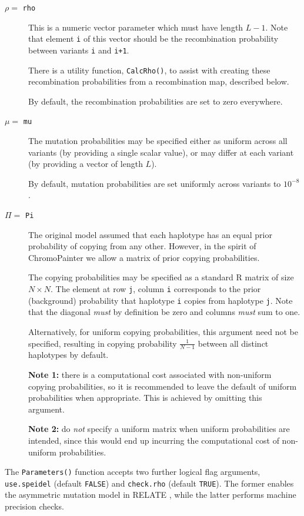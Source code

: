 \documentclass[a4paper]{article}
\let\proglang=\textsf
\begin{document}
\begin{description}
	\item[\(\rho =\) \texttt{rho}]
	This is a numeric vector parameter which must have length \(L-1\).
	Note that element \texttt{i} of this vector should be the recombination probability between variants \texttt{i} and \texttt{i+1}.

	There is a utility function, \texttt{CalcRho()}, to assist with creating these recombination probabilities from a recombination map, described below.

	By default, the recombination probabilities are set to zero everywhere.
	\item[\(\mu =\) \texttt{mu}]
	The mutation probabilities may be specified either as uniform across all variants (by providing a single scalar value), or may differ at each variant (by providing a vector of length \(L\)).

	By default, mutation probabilities are set uniformly across variants to \(10^{-8}\).
	\item[\(\Pi =\) \texttt{Pi}]
	The original \cite{Li2213} model assumed that each haplotype has an equal prior probability of copying from any other.
	However, in the spirit of ChromoPainter \cite{lawson2012inference} we allow a matrix of prior copying probabilities.

	The copying probabilities may be specified as a standard \proglang{R} matrix of size \(N \times N\).
	The element at row \texttt{j}, column \texttt{i} corresponds to the prior (background) probability that haplotype \texttt{i} copies from haplotype \texttt{j}.
	Note that the diagonal \emph{must} by definition be zero and columns \emph{must} sum to one.

	Alternatively, for uniform copying probabilities, this argument need not be specified, resulting in copying probability \(\frac{1}{N-1}\) between all distinct haplotypes by default.

	\textbf{Note 1:} there is a computational cost associated with non-uniform copying probabilities, so it is recommended to leave the default of uniform probabilities when appropriate.
	This is achieved by omitting this argument.

	\textbf{Note 2:} do \emph{not} specify a uniform matrix when uniform probabilities are intended, since this would end up incurring the computational cost of non-uniform probabilities.
\end{description}

The \texttt{Parameters()} function accepts two further logical flag arguments, \texttt{use.speidel} (default \texttt{FALSE}) and \texttt{check.rho} (default \texttt{TRUE}).
The former enables the asymmetric mutation model in RELATE \cite{speidel}, while the latter performs machine precision checks.
\end{document}
